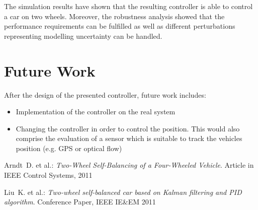 \documentclass[conference]{IEEEtran}
\begin{document}
The simulation results have shown that the resulting controller is able to control a car on two wheels. Moreover, the robustness analysis showed that the performance requirements can be fulfilled as well as different perturbations representing modelling uncertainty can be handled.


\section{Future Work}

After the design of the presented controller, future work includes:

\begin{itemize}
\item Implementation of the controller on the real system
\item Changing the controller in order to control the position. This would also comprise the evaluation of a sensor which is suitable to track the vehicles position (e.g. GPS or optical flow)
\end{itemize}

 
 
 
\begin{thebibliography}{1}

 {\sc Arndt~D. et al.}: {\it Two-Wheel Self-Balancing of a Four-Wheeled Vehicle}. Article in IEEE Control Systems, 2011

 {\sc Liu~K. et al.}: {\it Two-wheel self-balanced car based on Kalman filtering and PID algorithm}. Conference Paper, IEEE IE\&EM 2011


\end{thebibliography}


\end{document}
